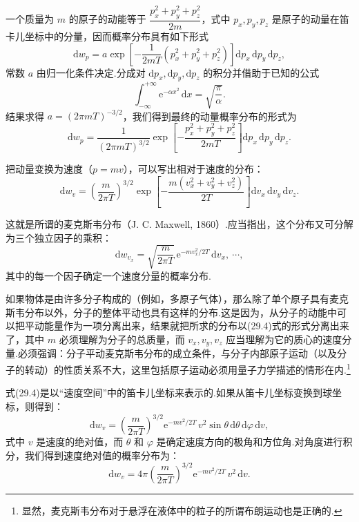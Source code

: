 一个质量为 $m$ 的原子的动能等于 $\dfrac{p_x^2+p_y^2+p_z^2}{2m}$，式中 $p_x,p_y,p_z$ 是原子的动量在笛卡儿坐标中的分量，因而概率分布具有如下形式
\begin{equation*}
  \mathrm{d}w_p=a\exp\left[-\frac{1}{2mT}\left(p_x^2+p_y^2+p_z^2\right)\right]\mathrm{d}p_x\,\mathrm{d}p_y\,\mathrm{d}p_z,
\end{equation*}
常数 $a$ 由归一化条件决定.分成对 $\mathrm{d}p_x,\mathrm{d}p_y,\mathrm{d}p_z$ 的积分并借助于已知的公式
\begin{equation*}
  \int_{-\infty}^{+\infty}\mathrm{e}^{-\alpha x^2}\,\mathrm{d}x=\sqrt{\frac{\pi}{\alpha}}.
\end{equation*}
结果求得 $a=(2\pi mT)^{-3/2}$，我们得到最终的动量概率分布的形式为
\begin{equation}
  \mathrm{d}w_p=\frac{1}{(2\pi mT)^{3/2}}\exp\left[-\frac{p_x^2+p_y^2+p_z^2}{2mT}\right]\mathrm{d}p_x\,\mathrm{d}p_y\,\mathrm{d}p_z.
\end{equation}

把动量变换为速度（$p=mv$），可以写出相对于速度的分布：
\begin{equation}
  \mathrm{d}w_v=\left(\frac{m}{2\pi T}\right)^{3/2}\exp\left[-\frac{m\left(v_x^2+v_y^2+v_z^2\right)}{2T}\right]\mathrm{d}v_x\,\mathrm{d}v_y\,\mathrm{d}v_z.
\end{equation}

这就是所谓的麦克斯韦分布（J. C. Maxwell, 1860）.应当指出，这个分布又可分解为三个独立因子的乘积：
\begin{equation}
  \mathrm{d}w_{v_x}=\sqrt{\frac{m}{2\pi T}}\,\mathrm{e}^{-mv_x^2/2T}\,\mathrm{d}v_x,\ \cdots,
\end{equation}
其中的每一个因子确定一个速度分量的概率分布.

如果物体是由许多分子构成的（例如，多原子气体），那么除了单个原子具有麦克斯韦分布以外，分子的整体平动也具有这样的分布.这是因为，从分子的动能中可以把平动能量作为一项分离出来，结果就把所求的分布以(29.4)式的形式分离出来了，其中 $m$ 必须理解为分子的总质量，而 $v_x,v_y,v_z$ 应当理解为它的质心的速度分量.必须强调：分子平动麦克斯韦分布的成立条件，与分子内部原子运动（以及分子的转动）的性质关系不大，这里包括原子运动必须用量子力学描述的情形在内.\footnote{显然，麦克斯韦分布对于悬浮在液体中的粒子的所谓布朗运动也是正确的.}

式(29.4)是以“速度空间”中的笛卡儿坐标来表示的.如果从笛卡儿坐标变换到球坐标，则得到：
\begin{equation}
  \mathrm{d}w_v=\left(\frac{m}{2\pi T}\right)^{3/2}\mathrm{e}^{-mv^2/2T}\,v^2\sin\theta\,\mathrm{d}\theta\,\mathrm{d}\varphi\,\mathrm{d}v,
\end{equation}
式中 $v$ 是速度的绝对值，而 $\theta$ 和 $\varphi$ 是确定速度方向的极角和方位角.对角度进行积分，我们得到速度绝对值的概率分布为：
\begin{equation}
  \mathrm{d}w_v=4\pi\left(\frac{m}{2\pi T}\right)^{3/2}\mathrm{e}^{-mv^2/2T}\,v^2\,\mathrm{d}v.
\end{equation}

